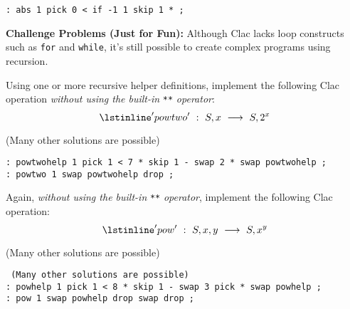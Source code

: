 \begin{solution}
\lstinline': abs 1 pick 0 < if -1 1 skip 1 * ;'
\end{solution}

\textbf{Challenge Problems (Just for Fun):} Although Clac lacks loop
constructs such as \lstinline'for' and \lstinline'while', it's still
possible to create complex programs using recursion.

\begin{part}
Using one or more recursive helper definitions, implement the
following Clac operation \textit{without using the built-in}
\lstinline'**' \textit{operator}:
$$\lstinline'powtwo' ~:~ S, x ~\longrightarrow~ S, 2^x$$
\end{part}

\begin{solution} (Many other solutions are possible)
\begin{lstlisting}
: powtwohelp 1 pick 1 < 7 * skip 1 - swap 2 * swap powtwohelp ;
: powtwo 1 swap powtwohelp drop ;
\end{lstlisting}
\end{solution}

\begin{part}
Again, \textit{without using the built-in} \lstinline'**'
\textit{operator}, implement the following Clac operation:
$$\lstinline'pow' ~:~ S, x, y ~\longrightarrow~ S, x^y$$
\end{part}

\begin{solution} (Many other solutions are possible)
\begin{lstlisting} (Many other solutions are possible)
: powhelp 1 pick 1 < 8 * skip 1 - swap 3 pick * swap powhelp ;
: pow 1 swap powhelp drop swap drop ;
\end{lstlisting}
\end{solution}
